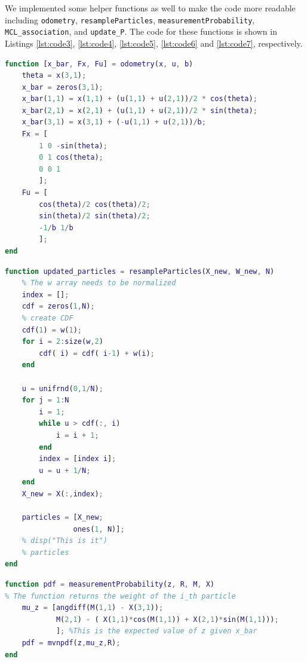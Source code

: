 \documentclass[answers]{exam}
\begin{document}
\begin{questions}
\begin{parts}
\begin{solution}
\begin{lstlisting}[language=Matlab, caption=Filter Step, label={lst:code2}]
            \end{lstlisting}
            We implemented some helper functions as well to make the code more readable
            including \texttt{odometry}, \texttt{resampleParticles},
            \texttt{measurementProbability}, \texttt{MCL\_association}, and
            \texttt{update\_P}. The code for these functions is shown in Listings
            \ref{lst:code3}, \ref{lst:code4}, \ref{lst:code5}, \ref{lst:code6} and
            \ref{lst:code7}, respectively.

            \begin{lstlisting}[language=Matlab, caption=Odometry, label={lst:code3}]
function [x_bar, Fx, Fu] = odometry(x, u, b)
    theta = x(3,1);
    x_bar = zeros(3,1);
    x_bar(1,1) = x(1,1) + (u(1,1) + u(2,1))/2 * cos(theta);
    x_bar(2,1) = x(2,1) + (u(1,1) + u(2,1))/2 * sin(theta);
    x_bar(3,1) = x(3,1) + (-u(1,1) + u(2,1))/b;
    Fx = [
        1 0 -sin(theta);
        0 1 cos(theta);
        0 0 1
        ];
    Fu = [
        cos(theta)/2 cos(theta)/2;
        sin(theta)/2 sin(theta)/2;
        -1/b 1/b
        ];
end
            \end{lstlisting}

            \begin{lstlisting}[language=Matlab, caption=Resample Particles, label={lst:code4}]
function updated_particles = resampleParticles(X_new, W_new, N)
    % The w array needs to be normalized
    index = [];
    cdf = zeros(1,N);
    % create CDF
    cdf(1) = w(1);
    for i = 2:size(w,2)
        cdf( i) = cdf( i-1) + w(i);
    end

    u = unifrnd(0,1/N);
    for j = 1:N
        i = 1;
        while u > cdf(:, i)
            i = i + 1;
        end
        index = [index i];
        u = u + 1/N;
    end
    X_new = X(:,index);

    particles = [X_new;
                ones(1, N)];
    % disp("This is it")
    % particles
end
            \end{lstlisting}

            \begin{lstlisting}[language=Matlab, caption=Measurement Probability, label={lst:code5}]
function pdf = measurementProbability(z, R, M, X)
% The function returns the weight of the i_th particle
    mu_z = [angdiff(M(1,1) - X(3,1));
            M(2,1) - ( X(1,1)*cos(M(1,1)) + X(2,1)*sin(M(1,1)));
            ]; %This is the expected value of z given x_bar
    pdf = mvnpdf(z,mu_z,R);
end
              \end{lstlisting}


\end{solution}
\end{parts}
\end{questions}
\end{document}
